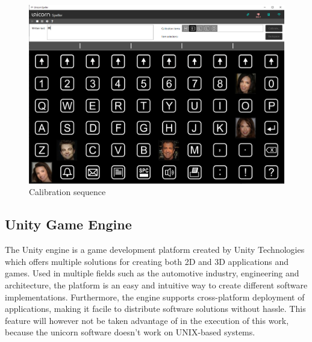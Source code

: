 \begin{figure}[H]
  \centering
  \includegraphics[width=1\textwidth]{Graphics/Speller Calibration.png}
  \caption{Calibration sequence}
\end{figure}
\vspace{\baselineskip}


\subsection{Unity Game Engine}
The Unity engine is a game development platform created by Unity Technologies which offers multiple solutions for creating both 2D and 3D applications and games. Used in multiple fields such as the automotive industry, engineering and architecture\cite{Unity_engine}, the platform is an easy and intuitive way to create different software implementations. Furthermore, the engine supports cross-platform deployment of applications, making it facile to distribute software solutions without hassle. This feature will however not be taken advantage of in the execution of this work, because the unicorn software doesn't work on UNIX-based systems\cite{UnicornSuite_Manual}.
\vspace{\baselineskip}


